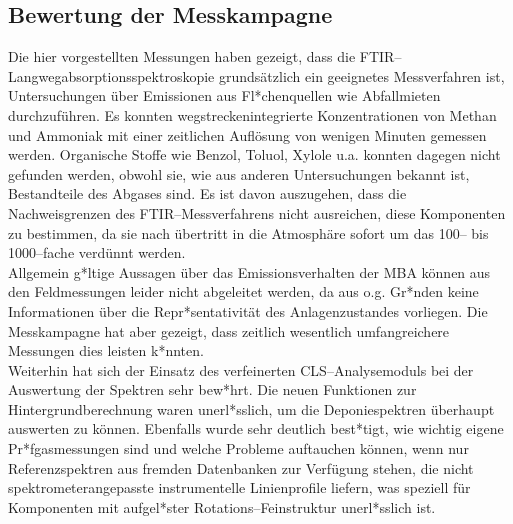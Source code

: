\subsection{\label{bewertmba}Bewertung der Messkampagne}


Die hier vorgestellten Messungen haben gezeigt, dass die
FTIR--Lang\-weg\-ab\-sorp\-tions\-spek\-tros\-ko\-pie
grundsätzlich ein geeignetes Messverfahren ist, Untersuchungen
über Emissionen aus Fl*chenquellen wie Abfallmieten durchzuführen.
Es konnten wegstreckenintegrierte Konzentrationen von Methan und
Ammoniak mit einer zeitlichen Auflösung von wenigen Minuten
gemessen werden. Organische Stoffe wie Benzol, Toluol, Xylole u.a.
konnten dagegen nicht gefunden werden, obwohl sie, wie aus anderen
Untersuchungen bekannt ist, Bestandteile des Abgases sind. Es ist
davon auszugehen, dass die Nachweisgrenzen des
FTIR--Messverfahrens nicht ausreichen, diese Komponenten zu
bestimmen, da sie nach übertritt in die Atmosphäre sofort um das
100-- bis 1000--fache verdünnt werden.\\

Allgemein g*ltige Aussagen über das Emissionsverhalten der MBA
können aus den Feldmessungen leider nicht abgeleitet werden, da
aus o.g. Gr*nden keine Informationen über die Repr*sentativität
des Anlagenzustandes vorliegen. Die Messkampagne hat aber gezeigt,
dass zeitlich wesentlich umfangreichere Messungen dies leisten
k*nnten.\\

Weiterhin hat sich der Einsatz des verfeinerten CLS--Analysemoduls
bei der Auswertung der Spektren sehr bew*hrt. Die neuen Funktionen
zur Hintergrundberechnung waren unerl*sslich, um die
Deponiespektren überhaupt auswerten zu können. Ebenfalls wurde
sehr deutlich best*tigt, wie wichtig eigene Pr*fgasmessungen sind
und welche Probleme auftauchen können, wenn nur Referenzspektren
aus fremden Datenbanken zur Verfügung stehen, die nicht
spektrometerangepasste instrumentelle Linienprofile liefern, was
speziell für Komponenten mit aufgel*ster Rotations--Feinstruktur
unerl*ss\-lich ist.\\


\cleardoublepage
